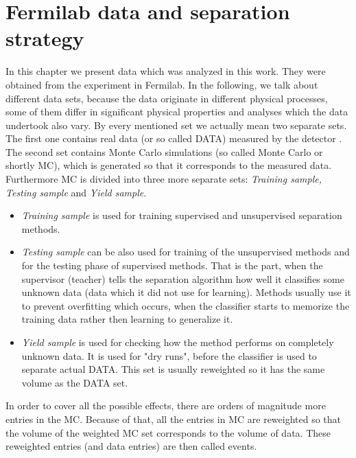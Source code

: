 \chapter{Fermilab data and separation strategy}

In this chapter we present data which was analyzed in this work. They were obtained from the experiment \dzero in Fermilab. In the following, we talk about different data sets, because the data originate in different physical processes, some of them differ in significant physical properties and analyses which the data undertook also vary. By every mentioned set we actually mean two separate sets. The first one contains real data (or so called DATA) measured by the detector \dzero. The second set contains Monte Carlo simulations (so called Monte Carlo or shortly MC), which is generated so that it corresponds to the measured data. Furthermore MC is divided into three more separate sets: {\em Training sample, Testing sample} and {\em Yield sample}. 
\begin{itemize}
\item {\em Training sample} is used for training supervised and unsupervised separation methods. 
\item {\em Testing sample} can be also used for training of the unsupervised methods and for the testing phase of supervised methods. That is the part, when the supervisor (teacher) tells the separation algorithm how well it classifies some unknown data (data which it did not use for learning). Methods usually use it to prevent overfitting which occurs, when the classifier starts to memorize the training data rather then learning to generalize it.
\item {\em Yield sample} is used for checking how the method performs on completely unknown data. It is used for "dry runs", before the classifier is used to separate actual DATA. This set is usually reweighted so it has the same volume as the DATA set.
\end{itemize}

In order to cover all the possible effects, there are orders of magnitude more entries in the MC. Because of that, all the entries in MC are reweighted so that the volume of the weighted MC set corresponds to the volume of data. These reweighted entries (and data entries) are then called events.

